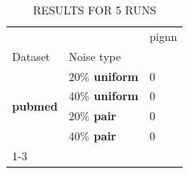 \begin{table}
\caption{RESULTS FOR 5 RUNS}
\begin{tabular}{lll}
\toprule
 &  & pignn \\
Dataset & Noise type &  \\
\midrule
\multirow[t]{4}{*}{\textbf{pubmed}} & \textbf{$ 20 \% $ uniform} & 0 \\
\textbf{} & \textbf{$ 40 \% $ uniform} & 0 \\
\textbf{} & \textbf{$ 20 \% $ pair} & 0 \\
\textbf{} & \textbf{$ 40 \% $ pair} & 0 \\
\cline{1-3}
\bottomrule
\end{tabular}
\end{table}
